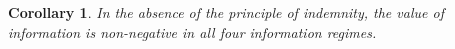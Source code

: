 \documentclass[natbib=false,preprint,12pt]{elsarticle}
\theoremstyle{plain}
\newtheorem{corollary}[theorem]{Corollary}
\theoremstyle{definition}
\theoremstyle{plain}
\theoremstyle{TheoremNum}
\theoremstyle{CorollaryNum}
\theoremstyle{PropositionNum}
\theoremstyle{TheoremNum}
\begin{document}



\setcounter{theorem}{0}
\renewcommand{\thetheorem}{\arabic{theorem}}
\begin{corollary}\label{corollary:nonnegnp}
In the absence of the principle of indemnity, the value of information is non-negative in all four information regimes.
\end{corollary}
\end{document}
